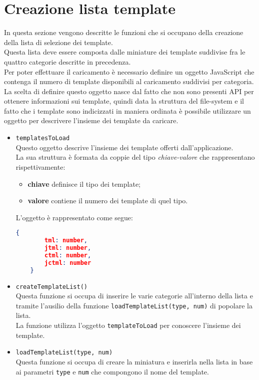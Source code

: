 \section{Creazione lista template}
In questa sezione vengono descritte le funzioni che si occupano della creazione della lista di selezione dei template.\\
Questa lista deve essere composta dalle miniature dei template suddivise fra le quattro categorie descritte in precedenza.\\
Per poter effettuare il caricamento è necessario definire un oggetto JavaScript che contenga il numero di template disponibili al caricamento suddivisi per categoria.\\
La scelta di definire questo oggetto nasce dal fatto che non sono presenti API per ottenere informazioni sui template, quindi data la struttura del file-system e il fatto che i template sono indicizzati in maniera ordinata è possibile utilizzare un oggetto per descrivere l'insieme dei template da caricare.\\

\begin{itemize}
	\item \texttt{templatesToLoad}\\
	Questo oggetto descrive l'insieme dei template offerti dall'applicazione.\\
	La sua struttura è formata da coppie del tipo \textit{chiave-valore} che rappresentano rispettivamente:
	\begin{itemize}
		\item \textbf{chiave} definisce il tipo dei template;
		\item \textbf{valore} contiene il numero dei template di quel tipo.
	\end{itemize}
	L'oggetto è rappresentato come segue:
	\begin{lstlisting}[language=JSON, caption= Struttura oggetto \texttt{templatesToLoad}.]
	{
		tml: number,
		jtml: number,
		ctml: number,
		jctml: number
	}
	\end{lstlisting}
	
	\item \texttt{createTemplateList()}\\
	Questa funzione si occupa di inserire le varie categorie all'interno della lista e tramite l'ausilio della funzione \texttt{loadTemplateList(type, num)} di popolare la lista.\\
	La funzione utilizza l'oggetto \texttt{templateToLoad} per conoscere l'insieme dei template.
	
	\item \texttt{loadTemplateList(type, num)}\\
	Questa funzione si occupa di creare la miniatura e inserirla nella lista in base ai parametri \texttt{type} e \texttt{num} che compongono il nome del template.
\end{itemize}

